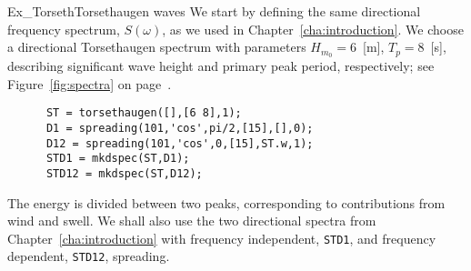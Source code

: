 \begin{rtex}{Ex_Torseth}{Torsethaugen waves}
We start by defining the same directional frequency spectrum, $S(\omega)$, as we
used in Chapter~\ref{cha:introduction}. %
We choose a directional Torsethaugen spectrum with
parameters $H_{m_0} = 6$~[m], $T_p = 8$~[s], describing significant wave
height and primary peak period, respectively; see Figure~\ref{fig:spectra} 
on page~\pageref{page:torsethaugen}.
{\small\begin{verbatim}
      ST = torsethaugen([],[6 8],1);
      D1 = spreading(101,'cos',pi/2,[15],[],0);
      D12 = spreading(101,'cos',0,[15],ST.w,1);
      STD1 = mkdspec(ST,D1);
      STD12 = mkdspec(ST,D12);
\end{verbatim}}
The energy is divided
between two peaks, corresponding to contributions from wind and swell.
We shall also use the two directional spectra from
Chapter~\ref{cha:introduction} with frequency independent, {\tt STD1},
and frequency dependent, {\tt STD12}, spreading.
\end{rtex}

